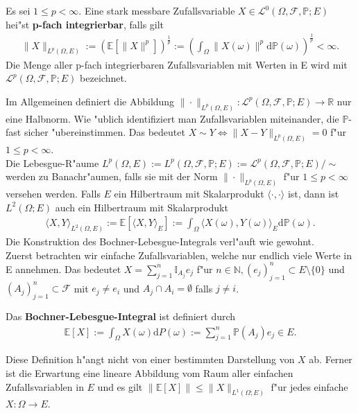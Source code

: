 \begin{df}
Es sei $1\leq p <\infty$. Eine stark messbare Zufallsvariable $X \in \mathcal{L}^0(\Omega,\mathcal{F},\mathbb{P};E)$ hei"st \textbf{p-fach integrierbar}, falls gilt
\begin{align*}
\|X\|_{L^p(\Omega,E)}:=(\mathbb{E}[\|X\|^p])^{\frac{1}{p}}:=\left(\int_\Omega \|X(\omega)\|^p \text{d}\mathbb{P}(\omega)\right)^{\frac{1}{p}}<\infty.
\end{align*}
Die Menge aller p-fach integrierbaren Zufallsvariablen mit Werten in E wird mit $\mathcal{L}^p(\Omega,\mathcal{F},\mathbb{P};E)$ bezeichnet.
\end{df}
Im Allgemeinen definiert die Abbildung $\|\cdot\|_{L^p{(\Omega,E)}}:\mathcal{L}^p(\Omega,\mathcal{F},\mathbb{P};E)\rightarrow \mathbb{R}$ nur eine Halbnorm.
Wie "ublich identifiziert man Zufallsvariablen miteinander, die $\mathbb{P}$-fast sicher "ubereinstimmen. Das bedeutet $X\sim Y \Leftrightarrow \|X-Y\|_{L^p(\Omega,E)}=0$ f"ur $1\leq p<\infty$.\\
Die Lebesgue-R"aume $L^p(\Omega,E):=L^p(\Omega,\mathcal{F},\mathbb{P};E):=\mathcal{L}^p(\Omega,\mathcal{F},\mathbb{P};E)/\sim$ werden zu Banachr"aumen, falls sie mit der Norm $\|\cdot\|_{L^p(\Omega,E)}$ f"ur $1\leq p < \infty$ versehen werden.
Falls $E$ ein Hilbertraum mit Skalarprodukt $\langle\cdot,\cdot\rangle$ ist, dann ist $L^2(\Omega;E)$ auch ein Hilbertraum mit Skalarprodukt
\begin{align*}
\langle X,Y \rangle_{L^2(\Omega,E)}:=\mathbb{E}[\langle X,Y \rangle_E]:=\int_\Omega \langle X(\omega),Y(\omega) \rangle_E \text{d}\mathbb{P}(\omega).
\end{align*}
Die Konstruktion des Bochner-Lebesgue-Integrals verl"auft wie gewohnt.\\
Zuerst betrachten wir einfache Zufallsvariablen, welche nur endlich viele Werte in E annehmen. Das bedeutet $X=\sum_{j=1}^n \mathbb{I}_{A_j}e_j$ f"ur $n\in\mathbb{N},(e_j)_{j=1}^n\subset E\setminus\{0\}$ und $(A_j)_{j=1}^n\subset \mathcal{F}$ mit $e_j\neq e_i$ und $A_j \cap A_i = \emptyset$ falls $j\neq i$.\\
\begin{df}
Das \textbf{Bochner-Lebesgue-Integral} ist definiert durch
\begin{align*}
\mathbb{E}[X]:=\int_\Omega X(\omega)\text{d}P(\omega):=\sum_{j=1}^n\mathbb{P}(A_j)e_j\in E.
\end{align*}
\end{df}
Diese Definition h"angt nicht von einer bestimmten Darstellung von $X$ ab. Ferner ist die Erwartung eine lineare Abbildung vom Raum aller einfachen Zufallsvariablen in $E$ und es gilt $\|\mathbb{E}[X]\|\leq\|X\|_{L^1(\Omega;E)}$ f"ur jedes einfache $X:\Omega\rightarrow E.$\\[0,1cm]
